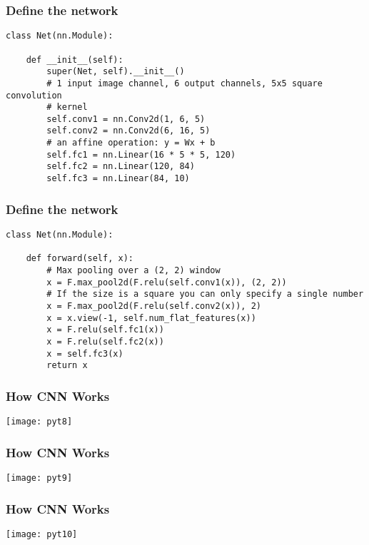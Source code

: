 \begin{frame}[fragile] \frametitle{Define the network}
\begin{lstlisting}
class Net(nn.Module):

    def __init__(self):
        super(Net, self).__init__()
        # 1 input image channel, 6 output channels, 5x5 square convolution
        # kernel
        self.conv1 = nn.Conv2d(1, 6, 5)
        self.conv2 = nn.Conv2d(6, 16, 5)
        # an affine operation: y = Wx + b
        self.fc1 = nn.Linear(16 * 5 * 5, 120)
        self.fc2 = nn.Linear(120, 84)
        self.fc3 = nn.Linear(84, 10)
\end{lstlisting}
\end{frame}



\begin{frame}[fragile] \frametitle{Define the network}
\begin{lstlisting}
class Net(nn.Module):

    def forward(self, x):
        # Max pooling over a (2, 2) window
        x = F.max_pool2d(F.relu(self.conv1(x)), (2, 2))
        # If the size is a square you can only specify a single number
        x = F.max_pool2d(F.relu(self.conv2(x)), 2)
        x = x.view(-1, self.num_flat_features(x))
        x = F.relu(self.fc1(x))
        x = F.relu(self.fc2(x))
        x = self.fc3(x)
        return x
\end{lstlisting}
\end{frame}

\begin{frame}[fragile] \frametitle{How CNN Works}
\begin{center}
\texttt{[image: pyt8]}
\end{center}

\end{frame}

\begin{frame}[fragile] \frametitle{How CNN Works}
\begin{center}
\texttt{[image: pyt9]}
\end{center}

\end{frame}

\begin{frame}[fragile] \frametitle{How CNN Works}
\begin{center}
\texttt{[image: pyt10]}
\end{center}

\end{frame}

